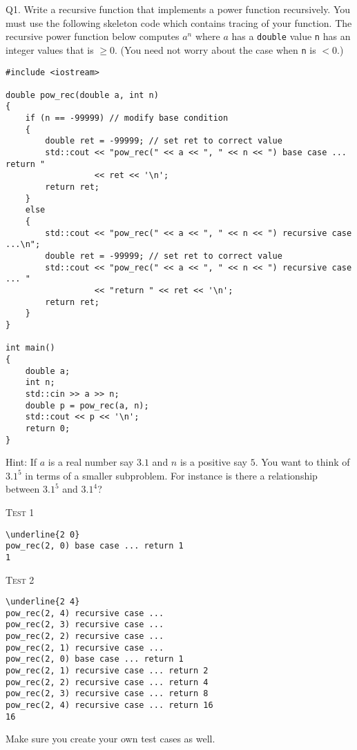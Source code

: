 \newpage
Q1. Write a recursive function that implements a power function
recursively. You must use the following skeleton code which
contains tracing of your function.
The recursive power function below computes $a^n$ where $a$ has a 
\verb!double! value \verb!n! has an integer values that is $\geq 0$.
(You need not worry about the case when \verb!n! is $< 0$.)
\begin{Verbatim}[frame=single, fontsize=\small]
#include <iostream>

double pow_rec(double a, int n)
{
    if (n == -99999) // modify base condition
    {
        double ret = -99999; // set ret to correct value
        std::cout << "pow_rec(" << a << ", " << n << ") base case ... return "
                  << ret << '\n';
        return ret;
    }
    else
    {
        std::cout << "pow_rec(" << a << ", " << n << ") recursive case ...\n";
        double ret = -99999; // set ret to correct value
        std::cout << "pow_rec(" << a << ", " << n << ") recursive case ... "
                  << "return " << ret << '\n';
        return ret;        
    }
}

int main()
{
    double a;
    int n;
    std::cin >> a >> n;
    double p = pow_rec(a, n);
    std::cout << p << '\n';
    return 0;
}
\end{Verbatim}

Hint:
If $a$ is a real number say $3.1$ and $n$ is a positive say $5$.
You want to think of $3.1^5$ in terms of a smaller subproblem.
For instance is there a relationship between $3.1^5$ and $3.1^4$?

\textsc{Test 1}
\begin{Verbatim}[frame=single, fontsize=\small, commandchars=\\\{\}]
\underline{2 0}
pow_rec(2, 0) base case ... return 1
1
\end{Verbatim}

\textsc{Test 2}
\begin{Verbatim}[frame=single, fontsize=\small, commandchars=\\\{\}]
\underline{2 4}
pow_rec(2, 4) recursive case ...
pow_rec(2, 3) recursive case ...
pow_rec(2, 2) recursive case ...
pow_rec(2, 1) recursive case ...
pow_rec(2, 0) base case ... return 1
pow_rec(2, 1) recursive case ... return 2
pow_rec(2, 2) recursive case ... return 4
pow_rec(2, 3) recursive case ... return 8
pow_rec(2, 4) recursive case ... return 16
16
\end{Verbatim}

Make sure you create your own test cases as well.




